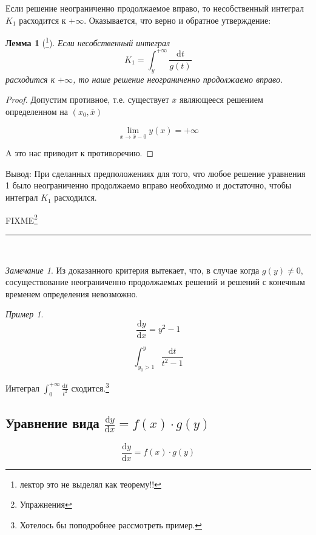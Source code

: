 \documentclass[a4paper,10pt]{report}
\newcommand{\ud}{\mathrm{d}}
\theoremstyle{definition}
\theoremstyle{remark}
\newtheorem{note}{Замечание}[section]
\newtheorem{example}{Пример}[section]
\theoremstyle{plain}
\newtheorem{lemma}[theorem]{Лемма}
\begin{document}
Если решение неограниченно продолжаемое вправо, то несобственный интеграл $K_1$ расходится к $+\infty$. Оказывается, что верно и обратное утверждение:

\begin{lemma}[\footnote{лектор это не выделял как теорему!!}]
 Если несобственный интеграл
 \[
  K_1 = \int_y^{+\infty} \frac{\ud t}{g(t)}
 \]
 расходится к $+\infty$, то наше решение неограниченно продолжаемо вправо.
\end{lemma}
\begin{proof}
 Допустим противное, т.е. существует $\overline{x}$ являющееся решением определенном на $(x_0,\overline{x})$

 \[
  \lim_{x \to \overline{x}-0} y(x) = +\infty
 \]

 A это нас приводит к противоречию.
\end{proof}

Вывод: При сделанных предположениях для того, что любое решение уравнения 1 было неограниченно продолжаемо вправо необходимо и достаточно, чтобы интеграл $K_1$ расходился.

FIXME\footnote{Упражнения}









\rule{.3\textwidth}{.5pt} \\

\begin{note}
 Из доказанного критерия вытекает, что, в случае когда $g(y) \ne 0$, сосуществование неограниченно продолжаемых решений и решений с конечным временем определения невозможно.
\end{note}
\begin{example}
 \[
  \frac{\ud y}{\ud x} = y^2 - 1
 \]

 \[
  \int_{y_0 > 1}^y \frac{\ud t}{t^2-1}
 \]

 Интеграл $\int_0^{+\infty} \frac{\ud t}{t^2}$ сходится.\footnote{Хотелось бы поподробнее рассмотреть пример.}
\end{example}

\subsection{Уравнение вида $\displaystyle \frac{\ud y}{\ud x} = f(x) \cdot g(y)$}
\begin{equation}
 \frac{\ud y}{\ud x} = f(x) \cdot g(y)
 \label{eq:dy/dx=f(x)g(y)}
\end{equation}
\end{document}
